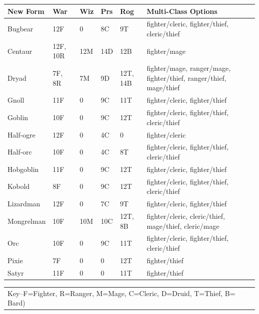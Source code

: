 \noindent
\begin{minipage}{\textwidth}

\noindent
{}
\begin{tabular}{|p{}|p{}|p{}|p{}|p{}|p{}|}
\hline
New Form	& War	& Wiz	& Prs	& Rog	& Multi-Class Options \\
\hline\hline
\rowcolor[gray]{0.9}Bugbear	& 12F	& 0	& 8C	& 9T	& fighter/cleric, fighter/thief, cleric/thief \\
Centaur	& 12F, 10R	& 12M	& 14D	& 12B	& fighter/mage \\
\rowcolor[gray]{0.9}Dryad	& 7F, 8R	& 7M	& 9D	& 12T, 14B	& fighter/mage, ranger/mage, fighter/thief, ranger/thief, mage/thief \\
Gnoll	& 11F	& 0	& 9C	& 11T	& fighter/cleric, fighter/thief \\
\rowcolor[gray]{0.9}Goblin	& 10F	& 0	& 9C	& 12T	& fighter/cleric, fighter/thief, cleric/thief \\
Half-ogre	& 12F	& 0	& 4C	& 0	& fighter/cleric \\
\rowcolor[gray]{0.9}Half-orc	& 10F	& 0	& 4C	& 8T	& fighter/cleric, fighter/thief, cleric/thief \\
Hobgoblin	& 11F	& 0	& 9C	& 12T	& fighter/cleric, fighter/thief \\
\rowcolor[gray]{0.9}Kobold	& 8F	& 0	& 9C	& 12T	& fighter/cleric, fighter/thief, cleric/thief \\
Lizardman	& 12F	& 0	& 7C	& 9T	& fighter/cleric, fighter/thief \\
\rowcolor[gray]{0.9}Mongrelman	& 10F	& 10M	& 10C	& 12T, 8B	& fighter/cleric, cleric/thief, mage/thief, cleric/mage \\
Orc	& 10F	& 0	& 9C	& 11T	& fighter/cleric, fighter/thief, cleric/thief \\
\rowcolor[gray]{0.9}Pixie	& 7F	& 0	& 0	& 12T	& fighter/thief \\
Satyr	& 11F	& 0	& 0	& 11T	& fighter/thief \\
\hline
\end{tabular}
\noindent\begin{tabular}{p{}}
Key--F=Fighter, R=Ranger, M=Mage, C=Cleric, D=Druid, T=Thief, B= Bard) \\
\end{tabular}\vspace{.5em}

\end{minipage}

